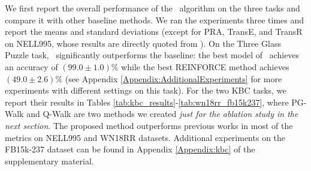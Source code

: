 \documentclass{article}
\begin{document}
	We first report the overall performance of the \modelname~algorithm on the three tasks and compare it with other baseline methods. We ran the experiments three times and report the means and standard deviations (except for PRA, TransE, and TransR on NELL995, whose results are directly quoted from \cite{DeepPath}). On the Three Glass Puzzle task, \modelname~significantly outperforms the baseline: the best model of \modelname~achieves an accuracy of $(99.0 \pm 1.0)\%$ while the best REINFORCE method achieves $(49.0 \pm 2.6)\%$ (see Appendix \ref{Appendix:AdditionalExperiments} for more experiments with different settings on this task). For the two KBC tasks, we report their results in Tables \ref{tab:kbc_results}-\ref{tab:wn18rr_fb15k237}, where PG-Walk and Q-Walk are two methods we created \emph{just for the ablation study in the next section}. The proposed method outperforms previous works in most of the metrics on NELL995 and WN18RR datasets. Additional experiments on the FB15k-237 dataset can be found in Appendix \ref{Appendix:kbc} of the supplementary material.
    	
\end{document}
